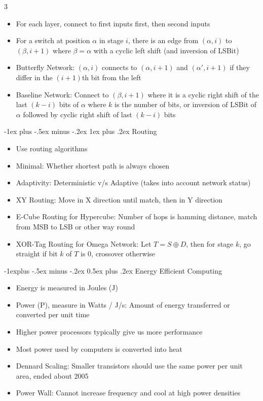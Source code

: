 \documentclass[10pt, landscape]{article}
\makeatletter
\renewcommand{\section}{\@startsection{section}{1}{0mm}%
                                {-1ex plus -.5ex minus -.2ex}%
                                {0.5ex plus .2ex}%
                                {\normalfont\large\bfseries}}
\renewcommand{\section}{\@startsection{section}{2}{0mm}%
                                {-1explus -.5ex minus -.2ex}%
                                {0.5ex plus .2ex}%
                                {\normalfont\normalsize\bfseries}}
\renewcommand{\subsection}{\@startsection{subsection}{3}{0mm}%
                                {-1ex plus -.5ex minus -.2ex}%
                                {1ex plus .2ex}%
                                {\normalfont\small\bfseries}}%
\makeatother
\begin{document}
\begin{multicols*}{3}
\begin{itemize}
\begin{itemize}
        \item For each layer, connect to first inputs first, then second inputs
        \item For a switch at position $\alpha$ in stage $i$, there is an edge from $(\alpha, i)$ to $(\beta, i+1)$ where $\beta=\alpha$ with a cyclic left shift (and inversion of LSBit)
        \item Butterfly Network: $(\alpha, i)$ connects to $(\alpha, i+1)$ and $(\alpha', i+1)$ if they differ in the $(i+1)$th bit from the left
        \item Baseline Network: Connect to $(\beta, i+1)$ where it is a cyclic right shift of the last $(k-i)$ bits of $\alpha$ where $k$ is the number of bits, or inversion of LSBit of $\alpha$ followed by cyclic right shift of last $(k-i)$ bits
    \end{itemize}
\end{itemize}

\subsection{Routing}
\begin{itemize}
    \item Use routing algorithms
    \item Minimal: Whether shortest path is always chosen
    \item Adaptivity: Deterministic v/s Adaptive (takes into account network status)
    \item XY Routing: Move in X direction until match, then in Y direction
    \item E-Cube Routing for Hypercube: Number of hops is hamming distance, match from MSB to LSB or other way round
    \item XOR-Tag Routing for Omega Network: Let $T=S \oplus D$, then for stage $k$, go straight if bit $k$ of $T$ is 0, crossover otherwise
\end{itemize}

\section{Energy Efficient Computing}
\begin{itemize}
    \item Energy is measured in Joules (J)
    \item Power (P), measure in Watts / J/s: Amount of energy transferred or converted per unit time
    \item Higher power processors typically give us more performance
    \item Most power used by computers is converted into heat
    \item Dennard Scaling: Smaller transistors should use the same power per unit area, ended about 2005
    \item Power Wall: Cannot increase frequency and cool at high power densities
\end{itemize}


\end{multicols*}
\end{document}
